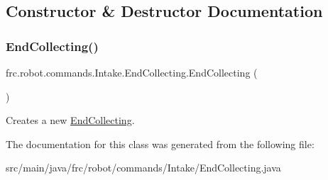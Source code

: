 \subsection{Constructor \& Destructor Documentation}
\mbox{\label{classfrc_1_1robot_1_1commands_1_1_intake_1_1_end_collecting_aec353232e9424d6b1a5c125006c4b57c}} 
\subsubsection{\texorpdfstring{EndCollecting()}{EndCollecting()}}
{\footnotesize\ttfamily frc.\+robot.\+commands.\+Intake.\+End\+Collecting.\+End\+Collecting (\begin{DoxyParamCaption}{ }\end{DoxyParamCaption})\hspace{0.3cm}{\ttfamily [inline]}}

Creates a new \mbox{\hyperlink{classfrc_1_1robot_1_1commands_1_1_intake_1_1_end_collecting}{End\+Collecting}}. 

The documentation for this class was generated from the following file\+:\begin{DoxyCompactItemize}
\item 
src/main/java/frc/robot/commands/\+Intake/End\+Collecting.\+java\end{DoxyCompactItemize}
